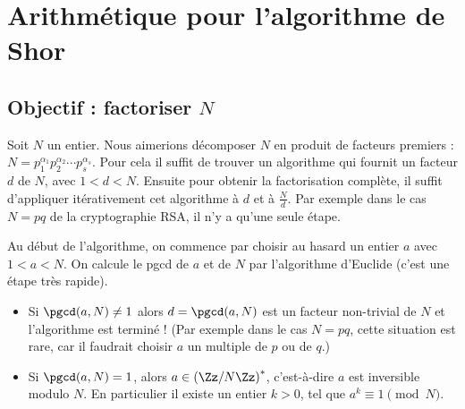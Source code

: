 \documentclass[11pt,class=report,crop=false]{standalone}
\begin{document}








\section{Arithmétique pour l'algorithme de Shor}

\subsection{Objectif : factoriser $N$}

Soit $N$ un entier. Nous aimerions décomposer $N$ en produit de facteurs premiers : $N = p_1^{\alpha_1}p_2^{\alpha_2}\cdots p_s^{\alpha_s}$.
Pour cela il suffit de trouver un algorithme qui fournit un facteur $d$ de $N$, avec $1 < d < N$. Ensuite pour obtenir la factorisation complète, il suffit d'appliquer itérativement cet algorithme à $d$ et à $\frac{N}{d}$. Par exemple dans le cas $N=pq$ de la cryptographie RSA, il n'y a qu'une seule étape.

Au début de l'algorithme, on commence par choisir au hasard un entier $a$ avec $1<a<N$.
On calcule le pgcd de $a$ et de $N$ par l'algorithme d'Euclide (c'est une étape très rapide). 
\begin{itemize}
  \item Si $\pgcd(a,N) \neq 1$ alors $d = \pgcd(a,N)$ est un facteur non-trivial de $N$ et l'algorithme est terminé ! (Par exemple dans le cas $N=pq$, cette situation est rare, car il faudrait choisir $a$ un multiple de $p$ ou de $q$.)
  \item Si $\pgcd(a,N) = 1$, alors $a \in \left(\Zz/N\Zz\right)^*$, c'est-à-dire $a$ est inversible modulo $N$. En particulier il existe un entier $k>0$, tel que $a^k \equiv 1 \pmod{N}$. 
\end{itemize}
\end{document}
